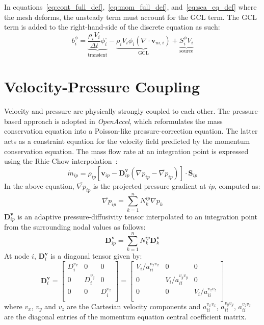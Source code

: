 \documentclass[12pt]{extarticle}
\newcommand{\<}{\langle}
\renewcommand{\>}{\rangle}
\theoremstyle{definition}
\begin{document}
In equations~\ref{eq:cont_full_def},~\ref{eq:mom_full_def}, and~\ref{eq:sca_eq_def} where the mesh deforms, the unsteady term must account for the GCL term. The GCL term is added to the right-hand-side of the discrete equation as such:
\begin{equation}
    b_i^{\phi} = \underbrace{\frac{\rho_i V_i}{\Delta t}\phi_i^{\circ}}_\text{transient}-\underbrace{\rho_i V_i \phi_i \left(\nabla \cdot \textbf{v}_{m,i} \right)}_\text{GCL} + \underbrace{S_i^{\phi} V_i}_\text{source}
\end{equation}


\section{Velocity-Pressure Coupling}

Velocity and pressure are physically strongly coupled to each other. The pressure-based approach is adopted in \textit{OpenAccel}, which reformulates the mass conservation equation into a Poisson-like pressure-correction equation. The latter acts as a constraint equation for the velocity field predicted by the momentum conservation equation. The mass flow rate at an integration point is expressed using the Rhie-Chow interpolation~\cite{rhie1983numerical}:
\begin{equation}
    \dot{m}_{ip} = \rho_{ip} \left[\textbf{v}_{ip} - \textbf{D}^{\textbf{v}}_{ip} \left ( \nabla p_{ip} - \overline{\nabla p}_{ip} \right)\right] \cdot \textbf{S}_{ip}
    \label{rhie_chow}
\end{equation}
In the above equation, $\overline{\nabla p}_{ip}$ is the projected pressure gradient at $ip$, computed as:
\begin{equation}
    \overline{\nabla p}_{ip} = \sum_{k=1}^n N_k^{ip} \nabla p_k
\end{equation}
\(\textbf{D}^{\textbf{v}}_{ip}\) is an adaptive pressure-diffusivity tensor interpolated to an integration point from the surrounding nodal values as follows:
\begin{equation}
\textbf{D}^{\textbf{v}}_{ip}=\sum_{k=1}^n N_k^{ip} \textbf{D}^{\textbf{v}}_k
\end{equation}
At node \(i\), \(\textbf{D}^{\textbf{v}}_{i}\) is a diagonal tensor given by:
\begin{equation}
\textbf{D}^{\textbf{v}}_{i}=
\begin{bmatrix}
D^{v_x}_i & 0 & 0\\
0 & D^{v_y}_i & 0 \\
0 & 0 & D^{v_z}_i\\
\end{bmatrix}=
\begin{bmatrix}
V_i/a_{ii}^{v_xv_x} & 0 & 0\\
0 & V_i/a_{ii}^{v_yv_y} & 0\\
0 & 0 & V_i/a_{ii}^{v_zv_z}\\
\end{bmatrix}
\end{equation}
where \({v_x}\), \({v_y}\) and \({v_z}\) are the Cartesian velocity components and \(a_{ii}^{v_xv_x}\), \(a_{ii}^{v_yv_y}\), \(a_{ii}^{v_zv_z}\) are the diagonal entries of the momentum equation central coefficient matrix.
\end{document}

